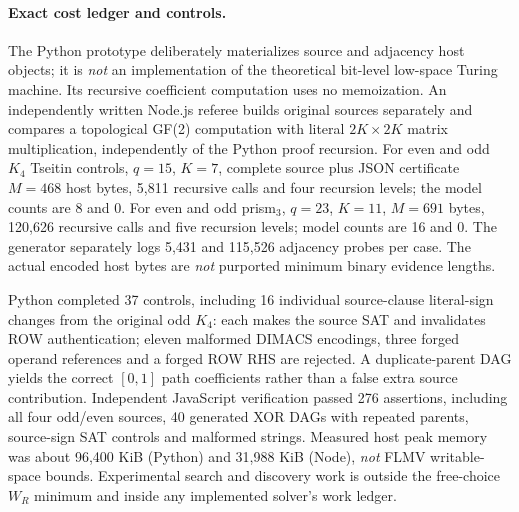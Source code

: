 \documentclass[11pt]{article}
\begin{document}
\paragraph{Exact cost ledger and controls.}
The Python prototype deliberately materializes source and adjacency host objects; it is \emph{not} an implementation of the theoretical bit-level low-space Turing machine. Its recursive coefficient computation uses no memoization. An independently written Node.js referee builds original sources separately and compares a topological GF(2) computation with literal $2K\times2K$ matrix multiplication, independently of the Python proof recursion. For even and odd $K_4$ Tseitin controls, $q=15$, $K=7$, complete source plus JSON certificate $M=468$ host bytes, 5,811 recursive calls and four recursion levels; the model counts are 8 and 0. For even and odd prism$_3$, $q=23$, $K=11$, $M=691$ bytes, 120,626 recursive calls and five recursion levels; model counts are 16 and 0. The generator separately logs 5,431 and 115,526 adjacency probes per case. The actual encoded host bytes are \emph{not} purported minimum binary evidence lengths.

Python completed 37 controls, including 16 individual source-clause literal-sign changes from the original odd $K_4$: each makes the source SAT and invalidates ROW authentication; eleven malformed DIMACS encodings, three forged operand references and a forged ROW RHS are rejected. A duplicate-parent DAG yields the correct $[0,1]$ path coefficients rather than a false extra source contribution. Independent JavaScript verification passed 276 assertions, including all four odd/even sources, 40 generated XOR DAGs with repeated parents, source-sign SAT controls and malformed strings. Measured host peak memory was about 96,400 KiB (Python) and 31,988 KiB (Node), \emph{not} FLMV writable-space bounds. Experimental search and discovery work is outside the free-choice $W_R$ minimum and inside any implemented solver's work ledger.
\end{document}

